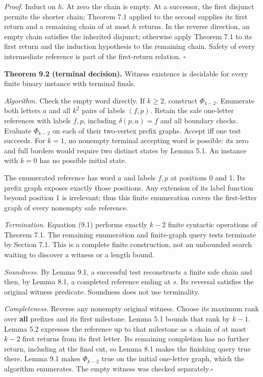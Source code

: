 \documentclass[
  11pt,
  a4paper,
]{article}
\newcounter{none} %
\begin{document}
\emph{Proof.} Induct on \(h\). At zero the chain is empty. At a
successor, the first disjunct permits the shorter chain; Theorem 7.1
applied to the second supplies its first return and a remaining chain of
at most \(h\) returns. In the reverse direction, an empty chain
satisfies the inherited disjunct; otherwise apply Theorem 7.1 to its
first return and the induction hypothesis to the remaining chain. Safety
of every intermediate reference is part of the first-return relation.
\(\square\)


\textbf{Theorem 9.2 (terminal decision).} Witness existence is decidable
for every finite binary instance with terminal finals.

\emph{Algorithm.} Check the empty word directly. If \(k\ge2\), construct
\(\Phi_{k-2}\). Enumerate both letters \(a\) and all \(k^2\) pairs of
labels \((f,p)\). Retain the safe one-letter references with labels
\(f,p\), including \(\delta(p,a)=f\) and all boundary checks. Evaluate
\(\Phi_{k-2}\) on each of their two-vertex prefix graphs. Accept iff one
test succeeds. For \(k=1\), no nonempty terminal accepting word is
possible: its zero and full borders would require two distinct states by
Lemma 5.1. An instance with \(k=0\) has no possible initial state.

The enumerated reference has word \(a\) and labels \(f,p\) at positions
0 and 1. Its prefix graph exposes exactly those positions. Any extension
of its label function beyond position 1 is irrelevant; thus this finite
enumeration covers the first-letter graph of every nonempty safe
reference.

\emph{Termination.} Equation (9.1) performs exactly \(k-2\) finite
syntactic operations of Theorem 7.1. The remaining enumeration and
finite-graph query tests terminate by Section 7.1. This is a complete
finite construction, not an unbounded search waiting to discover a
witness or a length bound.

\emph{Soundness.} By Lemma 9.1, a successful test reconstructs a finite
safe chain and then, by Lemma 8.1, a completed reference ending at
\(s\). Its reversal satisfies the original witness predicate. Soundness
does not use terminality.

\emph{Completeness.} Reverse any nonempty original witness. Choose its
maximum rank over \textbf{all} prefixes and its first milestone. Lemma
5.1 bounds that rank by \(k-1\). Lemma 5.2 expresses the reference up to
that milestone as a chain of at most \(k-2\) first returns from its
first letter. Its remaining completion has no further return, including
at the final cut, so Lemma 8.1 makes the finishing query true there.
Lemma 9.1 makes \(\Phi_{k-2}\) true on the initial one-letter graph,
which the algorithm enumerates. The empty witness was checked
separately.\nobreak\hspace{.5em}\(\square\)
\end{document}
